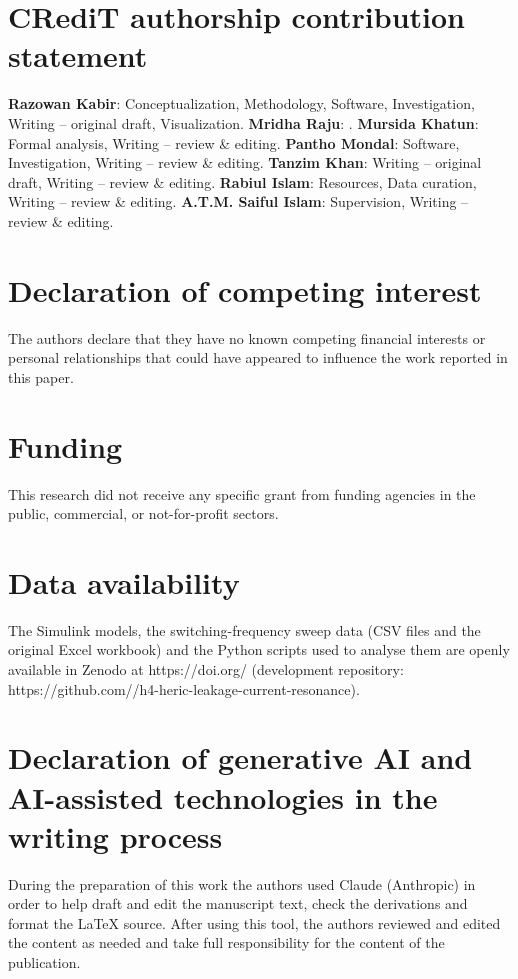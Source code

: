 \section*{CRediT authorship contribution statement}
\textbf{Razowan Kabir}: Conceptualization, Methodology, Software, Investigation, Writing -- original draft, Visualization.
\textbf{Mridha Raju}: .
\textbf{Mursida Khatun}: Formal analysis, Writing -- review \& editing.
\textbf{Pantho Mondal}: Software, Investigation, Writing -- review \& editing.
\textbf{Tanzim Khan}: Writing -- original draft, Writing -- review \& editing.
\textbf{Rabiul Islam}: Resources, Data curation, Writing -- review \& editing.
\textbf{A.T.M. Saiful Islam}: Supervision, Writing -- review \& editing.

\section*{Declaration of competing interest}
The authors declare that they have no known competing financial interests or personal relationships that could have appeared to influence the work reported in this paper.

\section*{Funding}
This research did not receive any specific grant from funding agencies in the public, commercial, or not-for-profit sectors.

\section*{Data availability}
The Simulink models, the switching-frequency sweep data (CSV files and the original Excel workbook) and the Python scripts used to analyse them are openly available in Zenodo at https://doi.org/ (development repository: https://github.com//h4-heric-leakage-current-resonance).

\section*{Declaration of generative AI and AI-assisted technologies in the writing process}
During the preparation of this work the authors used Claude (Anthropic) in order to help draft and edit the manuscript text, check the derivations and format the \LaTeX{} source. After using this tool, the authors reviewed and edited the content as needed and take full responsibility for the content of the publication.